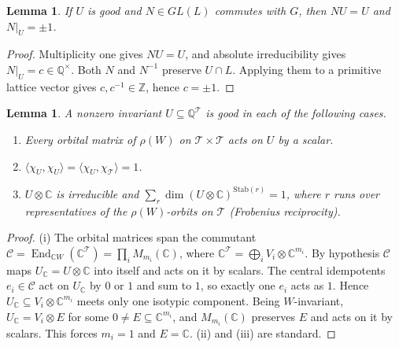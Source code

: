 \documentclass[11pt]{article}
\newtheorem{lemma}[theorem]{Lemma}
\theoremstyle{definition}
\newcommand{\Z}{\mathbb{Z}}
\newcommand{\Q}{\mathbb{Q}}
\newcommand{\C}{\mathbb{C}}
\newcommand{\T}{\mathcal{T}}
\newcommand{\End}{\operatorname{End}}
\begin{document}
\begin{lemma}\label{lem:schur}
If $U$ is good and $N\in GL(L)$ commutes with $G$, then $NU=U$ and $N|_U=\pm1$.
\end{lemma}
\begin{proof}
Multiplicity one gives $NU=U$, and absolute irreducibility gives $N|_U=c\in\Q^\times$.
Both $N$ and $N^{-1}$ preserve $U\cap L$. Applying them to a primitive lattice vector gives
$c,c^{-1}\in\Z$, hence $c=\pm1$.
\end{proof}

\begin{lemma}\label{lem:cert}
A nonzero invariant $U\subseteq\Q^\T$ is good in each of the following cases.
\begin{enumerate}[label=(\roman*)]
\item Every orbital matrix of $\rho(W)$ on $\T\times\T$ acts on $U$ by a scalar.
\item $\langle\chi_U,\chi_U\rangle=\langle\chi_U,\chi_\T\rangle=1$.
\item $U\otimes\C$ is irreducible and $\sum_r\dim(U\otimes\C)^{\mathrm{Stab}(r)}=1$, where $r$ runs over
representatives of the $\rho(W)$-orbits on $\T$ (Frobenius reciprocity).
\end{enumerate}
\end{lemma}
\begin{proof}
(i) The orbital matrices span the commutant $\mathcal C=\End_{\C W}(\C^\T)=\prod_iM_{m_i}(\C)$, where
$\C^\T=\bigoplus_iV_i\otimes\C^{m_i}$. By hypothesis $\mathcal C$ maps $U_\C=U\otimes\C$ into itself and acts on it
by scalars. The central idempotents $e_i\in\mathcal C$ act on $U_\C$ by $0$ or $1$ and sum to $1$, so exactly one
$e_i$ acts as $1$. Hence $U_\C\subseteq V_i\otimes\C^{m_i}$ meets only one isotypic component. Being
$W$-invariant, $U_\C=V_i\otimes E$ for some $0\ne E\subseteq\C^{m_i}$, and $M_{m_i}(\C)$ preserves $E$ and acts on it
by scalars. This forces $m_i=1$ and $E=\C$. (ii) and (iii) are standard.
\end{proof}
\end{document}
